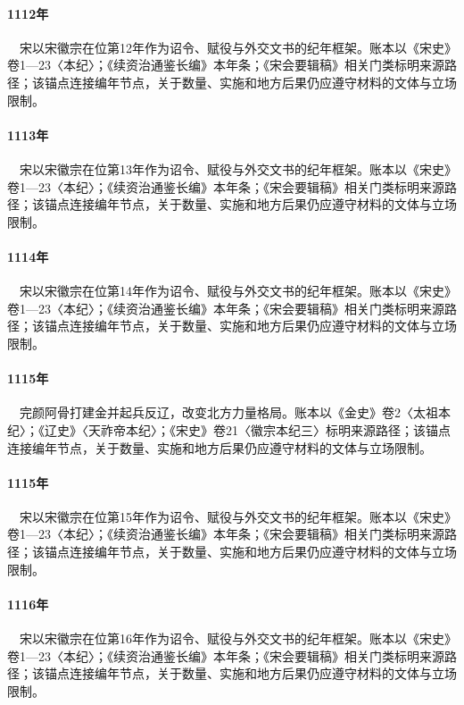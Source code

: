 \paragraph{1112年}　宋以宋徽宗在位第12年作为诏令、赋役与外交文书的纪年框架。账本以《宋史》卷1—23〈本纪〉；《续资治通鉴长编》本年条；《宋会要辑稿》相关门类标明来源路径；该锚点连接编年节点，关于数量、实施和地方后果仍应遵守材料的文体与立场限制。

\paragraph{1113年}　宋以宋徽宗在位第13年作为诏令、赋役与外交文书的纪年框架。账本以《宋史》卷1—23〈本纪〉；《续资治通鉴长编》本年条；《宋会要辑稿》相关门类标明来源路径；该锚点连接编年节点，关于数量、实施和地方后果仍应遵守材料的文体与立场限制。

\paragraph{1114年}　宋以宋徽宗在位第14年作为诏令、赋役与外交文书的纪年框架。账本以《宋史》卷1—23〈本纪〉；《续资治通鉴长编》本年条；《宋会要辑稿》相关门类标明来源路径；该锚点连接编年节点，关于数量、实施和地方后果仍应遵守材料的文体与立场限制。

\paragraph{1115年}　完颜阿骨打建金并起兵反辽，改变北方力量格局。账本以《金史》卷2〈太祖本纪〉；《辽史》〈天祚帝本纪〉；《宋史》卷21〈徽宗本纪三〉标明来源路径；该锚点连接编年节点，关于数量、实施和地方后果仍应遵守材料的文体与立场限制。

\paragraph{1115年}　宋以宋徽宗在位第15年作为诏令、赋役与外交文书的纪年框架。账本以《宋史》卷1—23〈本纪〉；《续资治通鉴长编》本年条；《宋会要辑稿》相关门类标明来源路径；该锚点连接编年节点，关于数量、实施和地方后果仍应遵守材料的文体与立场限制。

\paragraph{1116年}　宋以宋徽宗在位第16年作为诏令、赋役与外交文书的纪年框架。账本以《宋史》卷1—23〈本纪〉；《续资治通鉴长编》本年条；《宋会要辑稿》相关门类标明来源路径；该锚点连接编年节点，关于数量、实施和地方后果仍应遵守材料的文体与立场限制。

